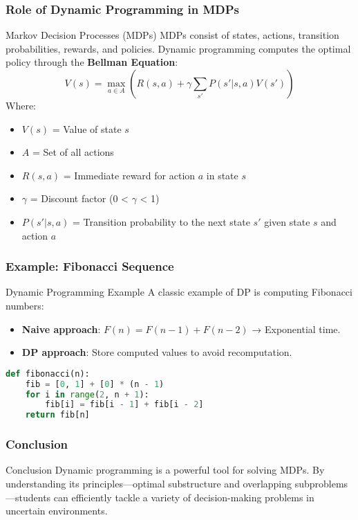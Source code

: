 \documentclass{beamer}
\begin{document}
\begin{frame}[fragile]
    \frametitle{Role of Dynamic Programming in MDPs}
    \begin{block}{Markov Decision Processes (MDPs)}
        MDPs consist of states, actions, transition probabilities, rewards, and policies. Dynamic programming computes the optimal policy through the 
        \textbf{Bellman Equation}:
        \begin{equation}
        V(s) = \max_{a \in A} \left( R(s, a) + \gamma \sum_{s'} P(s'|s, a)V(s') \right)
        \end{equation}
        Where:
        \begin{itemize}
            \item $V(s)$ = Value of state $s$
            \item $A$ = Set of all actions
            \item $R(s, a)$ = Immediate reward for action $a$ in state $s$
            \item $\gamma$ = Discount factor (0 < $\gamma$ < 1)
            \item $P(s'|s,a)$ = Transition probability to the next state $s'$ given state $s$ and action $a$
        \end{itemize}
    \end{block}
\end{frame}

\begin{frame}[fragile]
    \frametitle{Example: Fibonacci Sequence}
    \begin{block}{Dynamic Programming Example}
        A classic example of DP is computing Fibonacci numbers:
        \begin{itemize}
            \item \textbf{Naive approach}: $F(n) = F(n-1) + F(n-2)$ → Exponential time.
            \item \textbf{DP approach}: Store computed values to avoid recomputation.
        \end{itemize}
    \end{block}
    \begin{lstlisting}[language=Python]
def fibonacci(n):
    fib = [0, 1] + [0] * (n - 1)
    for i in range(2, n + 1):
        fib[i] = fib[i - 1] + fib[i - 2]
    return fib[n]
    \end{lstlisting}
\end{frame}

\begin{frame}[fragile]
    \frametitle{Conclusion}
    \begin{block}{Conclusion}
        Dynamic programming is a powerful tool for solving MDPs. By understanding its principles—optimal substructure and overlapping subproblems—students can efficiently tackle a variety of decision-making problems in uncertain environments.
    \end{block}
\end{frame}
\end{document}

